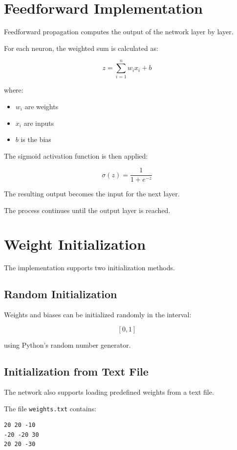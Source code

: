 \documentclass[12pt]{article}
\begin{document}
\section{Feedforward Implementation}

Feedforward propagation computes the output of the network layer by layer.

For each neuron, the weighted sum is calculated as:

\[
z = \sum_{i=1}^{n} w_i x_i + b
\]

where:
\begin{itemize}
    \item \(w_i\) are weights
    \item \(x_i\) are inputs
    \item \(b\) is the bias
\end{itemize}

The sigmoid activation function is then applied:

\[
\sigma(z) = \frac{1}{1 + e^{-z}}
\]

The resulting output becomes the input for the next layer.

The process continues until the output layer is reached.

\section{Weight Initialization}

The implementation supports two initialization methods.

\subsection{Random Initialization}

Weights and biases can be initialized randomly in the interval:

\[
[0,1]
\]

using Python's random number generator.

\subsection{Initialization from Text File}

The network also supports loading predefined weights from a text file.

The file \texttt{weights.txt} contains:

\begin{verbatim}
20 20 -10
-20 -20 30
20 20 -30
\end{verbatim}
\end{document}
